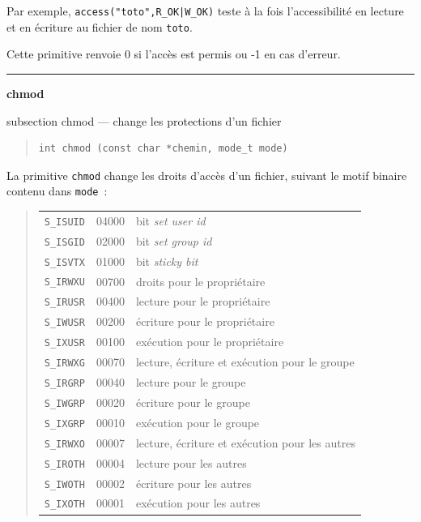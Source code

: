 \documentclass [twoside] {report}
\newcommand {\primitive} [1]
    {
	\phantomsection
	{\large \textbf {#1}}
	\addcontentsline {toc} {subsection} {#1}
    }
\newcommand {\separation}
    {
	\vspace {5mm}
	\nopagebreak
	\hrule
    }
\begin{document}
Par exemple, \verb/access("toto",R_OK|W_OK)/ teste à la fois
l'accessibilité en lecture et en écriture au fichier de nom \texttt {toto}.

Cette primitive renvoie 0 si l'accès est permis
ou -1 en cas d'erreur.




\separation
\primitive {chmod} --- change les protections d'un fichier

\begin {quote}
\begin {verbatim}
int chmod (const char *chemin, mode_t mode)
\end{verbatim}
\end {quote}

La primitive \texttt {chmod} change les droits d'accès
d'un fichier, suivant le motif binaire contenu
dans \texttt {mode}~:

\begin {quote}
    \begin {tabular} {|lll|} \hline
	\texttt {S\_ISUID} & 04000 & bit \textit {set user id} \\
	\texttt {S\_ISGID} & 02000 & bit \textit {set group id} \\
	\texttt {S\_ISVTX} & 01000 & bit \textit {sticky bit} \\
	\texttt {S\_IRWXU} & 00700 & droits pour le propriétaire \\
	\texttt {S\_IRUSR} & 00400 & lecture pour le propriétaire \\
	\texttt {S\_IWUSR} & 00200 & écriture pour le propriétaire \\
	\texttt {S\_IXUSR} & 00100 & exécution pour le propriétaire \\
	\texttt {S\_IRWXG} & 00070 & lecture, écriture et exécution pour le groupe \\
	\texttt {S\_IRGRP} & 00040 & lecture pour le groupe \\
	\texttt {S\_IWGRP} & 00020 & écriture pour le groupe \\
	\texttt {S\_IXGRP} & 00010 & exécution pour le groupe \\
	\texttt {S\_IRWXO} & 00007 & lecture, écriture et exécution pour les autres \\
	\texttt {S\_IROTH} & 00004 & lecture pour les autres \\
	\texttt {S\_IWOTH} & 00002 & écriture pour les autres \\
	\texttt {S\_IXOTH} & 00001 & exécution pour les autres \\ \hline
    \end {tabular}
\end {quote}
\end{document}
